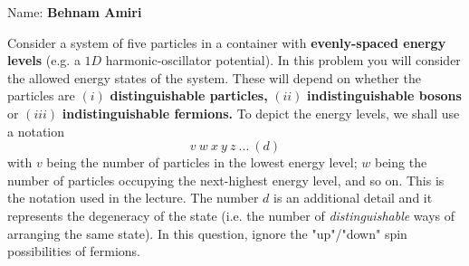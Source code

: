 \documentclass[fleqn]{article}
\begin{document}
  Name: \textbf{Behnam Amiri}

  \vspace{1cm}

  Consider a system of five particles in a container with \textbf{evenly-spaced energy levels} (e.g. a $1D$ 
  harmonic-oscillator potential).
  In this problem you will consider the allowed energy states of the system. These will depend on
  whether the particles are $(i)$ \textbf{distinguishable particles, } $(ii)$ \textbf{indistinguishable bosons}
  or $(iii)$ \textbf{indistinguishable fermions.}
  To depict the energy levels, we shall use a notation
  $$
    v ~ w ~ x ~ y ~ z ~ ... ~ (d)
  $$
  with $v$ being the number of particles in the lowest energy level; $w$ being the number of particles
  occupying the next-highest energy level, and so on. This is the notation used in the lecture. The
  number $d$ is an additional detail and it represents the degeneracy of the state (i.e. the number of
  \emph{distinguishable} ways of arranging the same state). In this question, ignore the "up"/"down" spin
  possibilities of fermions.

  \pagebreak
\end{document}
